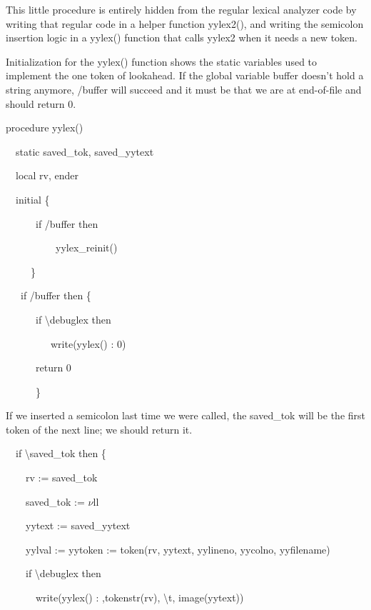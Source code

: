 This little procedure is entirely hidden from the regular lexical
analyzer code by writing that regular code in a helper function
yylex2(), and writing the semicolon insertion logic in a yylex()
function that calls yylex2 when it needs a new token.

Initialization for the yylex() function shows the static variables
used to implement the one token of lookahead. If the global variable
buffer doesn't hold a string anymore, /buffer will succeed and it must
be that we are at end-of-file and should return 0.

{\ttfamily\mdseries
procedure yylex()}

{\ttfamily\mdseries
\ \ static saved\_tok, saved\_yytext}

{\ttfamily\mdseries
\ \ local rv, ender}

{\ttfamily\mdseries
\ \ initial \{}

{\ttfamily\mdseries
\ \ \ \ \ \ if /buffer then}

{\ttfamily\mdseries
\ \ \ \ \ \ \ \ \ \ yylex\_reinit()}

{\ttfamily\mdseries
\ \ \ \ \ \}}

{\ttfamily\mdseries
\ \ \ if /buffer then \{}

{\ttfamily\mdseries
\ \ \ \ \ \ if {\textbackslash}debuglex then}

{\ttfamily\mdseries
\ \ \ \ \ \ \ \ \ write({\textquotedbl}yylex() : 0{\textquotedbl})}

{\ttfamily\mdseries
\ \ \ \ \ \ return 0}

{\ttfamily\mdseries
\ \ \ \ \ \ \}}


If we inserted a semicolon last time we were called, the saved\_tok will be the first token of the next line; we should
return it. 

{\ttfamily\mdseries
\ \ if {\textbackslash}saved\_tok then \{}

{\ttfamily\mdseries
\ \ \ \ rv := saved\_tok}

{\ttfamily\mdseries
\ \ \ \ saved\_tok := $\nu $ll}

{\ttfamily\mdseries
\ \ \ \ yytext := saved\_yytext}

{\ttfamily\mdseries
\ \ \ \ yylval := yytoken := token(rv, yytext, yylineno, yycolno, yyfilename)}

{\ttfamily\mdseries
\ \ \ \ if {\textbackslash}debuglex then}

{\ttfamily\mdseries
\ \ \ \ \ \ write({\textquotedbl}yylex() : {\textquotedbl},tokenstr(rv),
{\textquotedbl}{\textbackslash}t{\textquotedbl}, image(yytext))}

